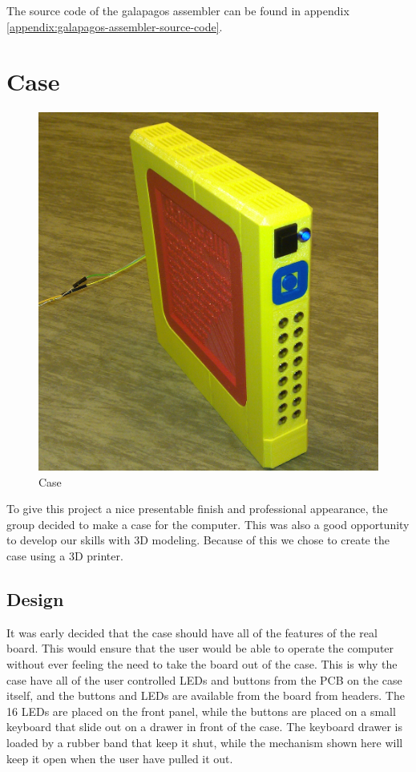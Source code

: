 The source code of the \Gls{galapagos assembler} can be found in appendix \vref{appendix:galapagos-assembler-source-code}.

\section{Case}

\begin{figure}[H]
\includegraphics[width=\textwidth,keepaspectratio,clip]{additional-components/case.jpg}%
\caption{Case}
\end{figure}

To give this project a nice presentable finish and professional appearance, the group decided to make a case for the computer.
This was also a good opportunity to develop our skills with 3D modeling.
Because of this we chose to create the case using a 3D printer.

\subsection {Design}

It was early decided that the case should have all of the features of the real board.
This would ensure that the user would be able to operate the computer without ever feeling the need to take the board out of the case.
This is why the case have all of the user controlled LEDs and buttons from the PCB on the case itself, and the buttons and LEDs are available from the board from headers.
The 16 LEDs are placed on the front panel, while the buttons are placed on a small keyboard that slide out on a drawer in front of the case.
The keyboard drawer is loaded by a rubber band that keep it shut, while the mechanism shown here will keep it open when the user have pulled it out.

